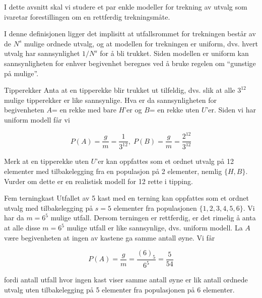 I dette avsnitt skal vi studere et par enkle modeller for
trekning av utvalg som ivaretar forestillingen om en rettferdig
trekningsmåte.

\begin{center}  \end{center}
I denne definisjonen ligger det implisitt at utfallsrommet for
trekningen består av de $N^s$ mulige ordnede utvalg, og at
modellen for trekningen er uniform, dvs. hvert utvalg har
sannsynlighet $1/N^s$ for å bli trukket. Siden modellen er
uniform kan sannsynligheten for enhver begivenhet beregnes ved å
bruke regelen om ``gunstige på mulige''.\\

\begin{eksempel}{Tipperekker}
Anta at en tipperekke blir trukket ut tilfeldig, dvs. slik at
alle $3^{12}$ mulige tipperekker er like sannsynlige. Hva er da
sannsynligheten for begivenheten $A$= en rekke med bare $H$'er og $B$=
en rekke uten $U$'er. Siden vi har uniform modell får vi

\[P(A)=\frac{g}{m}=\frac{1}{3^{12}},\; P(B)=\frac{g}{m}=\frac{2^{12}}{3^{12}}\]

\noindent Merk at en tipperekke uten $U$'er kan oppfattes som et ordnet
utvalg på 12 elementer med tilbakelegging fra en populasjon på 2
elementer, nemlig $\{H,B\}$. Vurder om dette er en realistisk
modell for 12 rette i tipping.
\end{eksempel}

\begin{eksempel}{Fem terningkast}
Utfallet av 5 kast med en terning kan oppfattes som et ordnet
utvalg med tilbakelegging på $s=5$ elementer fra populasjonen
$\{1,2,3,4,5,6\}$. Vi har da $m=6^5$ mulige utfall. Dersom
terningen er rettferdig, er det rimelig å anta at alle disse
$m=6^5$ mulige utfall er like sannsynlige, dvs. uniform modell.
La $A$ være begivenheten at ingen av kastene ga samme antall
øyne. Vi får

\[ P(A)=\frac{g}{m}=\frac{(6)_5}{6^5}=\frac{5}{54} \]

\noindent fordi antall utfall hvor ingen kast viser samme antall øyne er
lik antall ordnede utvalg uten tilbakelegging på 5 elementer fra
populasjonen på 6 elementer.
\end{eksempel}

